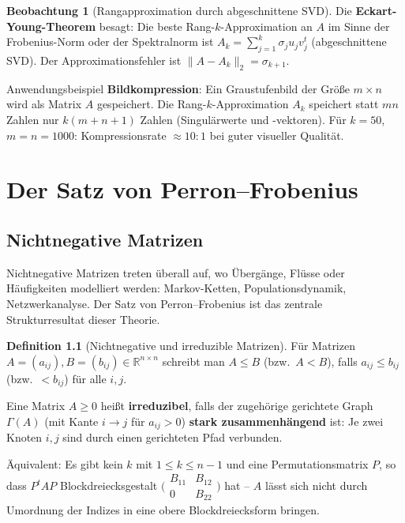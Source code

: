 ﻿\documentclass[a4paper,12pt]{report}
\theoremstyle{definition}
\newtheorem{definition}{Definition}
\newtheorem{beobachtung}{Beobachtung}
\begin{document}
\begin{beobachtung}[Rangapproximation durch abgeschnittene SVD]
    Die \textbf{Eckart-Young-Theorem} besagt: Die beste Rang-$k$-Approximation
    an $A$ im Sinne der Frobenius-Norm oder der Spektralnorm ist
    $A_k = \sum_{j=1}^k \sigma_j u_j v_j^t$ (abgeschnittene SVD).
    Der Approximationsfehler ist $\|A - A_k\|_2 = \sigma_{k+1}$.

    Anwendungsbeispiel \textbf{Bildkompression}: Ein Graustufenbild
    der Größe $m \times n$ wird als Matrix $A$ gespeichert.
    Die Rang-$k$-Approximation $A_k$ speichert statt $mn$ Zahlen
    nur $k(m + n + 1)$ Zahlen (Singulärwerte und -vektoren).
    Für $k = 50$, $m = n = 1000$: Kompressionsrate $\approx 10:1$
    bei guter visueller Qualität.
\end{beobachtung}

\chapter{Der Satz von Perron--Frobenius}

\section{Nichtnegative Matrizen}

Nichtnegative Matrizen treten überall auf, wo Übergänge, Flüsse oder
Häufigkeiten modelliert werden: Markov-Ketten, Populationsdynamik,
Netzwerkanalyse. Der Satz von Perron--Frobenius ist das zentrale
Strukturresultat dieser Theorie.

\begin{definition}[Nichtnegative und irreduzible Matrizen]
    Für Matrizen $A = (a_{ij}), B = (b_{ij}) \in \mathbb{R}^{n \times n}$
    schreibt man $A \leq B$ (bzw.\ $A < B$), falls $a_{ij} \leq b_{ij}$
    (bzw.\ $< b_{ij}$) für alle $i, j$.

    Eine Matrix $A \geq 0$ heißt \textbf{irreduzibel}, falls der
    zugehörige gerichtete Graph $\Gamma(A)$ (mit Kante $i \to j$ für
    $a_{ij} > 0$) \textbf{stark zusammenhängend} ist: Je zwei Knoten
    $i, j$ sind durch einen gerichteten Pfad verbunden.

    Äquivalent: Es gibt kein $k$ mit $1 \leq k \leq n-1$ und eine Permutationsmatrix
    $P$, so dass $P^t A P$ Blockdreiecksgestalt
    $\bigl(\begin{smallmatrix} B_{11} & B_{12} \\ 0 & B_{22} \end{smallmatrix}\bigr)$
    hat -- $A$ lässt sich nicht durch Umordnung der Indizes in eine
    obere Blockdreiecksform bringen.
\end{definition}
\end{document}
